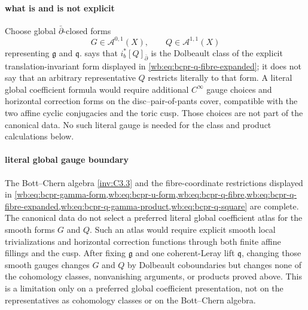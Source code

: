 \paragraph{what is and is not explicit}
\label{wb:rem:bcpr-literal-gauge}
Choose global $\bar\partial$-closed forms
\begin{equation}
 G\in\mathcal A^{0,1}(X),\qquad
 Q\in\mathcal A^{1,1}(X)
\end{equation}
representing $\mathfrak g$ and $\mathfrak q$.
 says that
$i_b^*[Q]_{\bar\partial}$ is the Dolbeault class of the explicit
translation-invariant
form displayed in \cref{wb:eq:bcpr-q-fibre-expanded}; it does not say that an arbitrary
representative $Q$ restricts literally to that form.  A literal global
coefficient formula would require additional $C^\infty$ gauge choices and
horizontal correction forms on the disc--pair-of-pants cover, compatible
with the two affine cyclic conjugacies and the toric cusp.  Those choices
are not part of the canonical data.  No such literal gauge is needed for
the class and product calculations below.




\paragraph{literal global gauge boundary}
\label{wb:rem:bcpr-global-gauge-boundary}
The Bott--Chern algebra \cref{inv:C3.3} and the fibre-coordinate
restrictions displayed in
\cref{wb:eq:bcpr-gamma-form,wb:eq:bcpr-u-form,wb:eq:bcpr-q-fibre,wb:eq:bcpr-q-fibre-expanded,wb:eq:bcpr-q-gamma-product,wb:eq:bcpr-q-square}
are complete.  The canonical data do not select a preferred literal global
coefficient atlas for the smooth forms $G$ and $Q$.  Such an atlas would
require explicit smooth local trivializations and horizontal correction
functions through both finite affine fillings and the cusp.  After fixing
$\mathfrak g$ and one coherent-Leray lift $\mathfrak q$, changing those
smooth gauges changes $G$ and $Q$ by Dolbeault coboundaries but changes
none of the cohomology classes, nonvanishing arguments, or products proved
above.  This is a limitation only on a preferred global coefficient
presentation, not on the representatives as cohomology classes or on the
Bott--Chern algebra.




